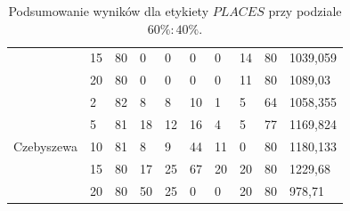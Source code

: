 \documentclass{classrep}
\begin{document}
\begin{table}[!ht]
\begin{tabular}{|l||l|l|l|l|l|l|l|l|l|}
                                      & 15                 & 80  & 0      & 0     & 0  & 0      & 14           & 80     & 1039,059                                     \\ \cline{2-10} 
                                      & 20                 & 80  & 0      & 0     & 0  & 0      & 11           & 80     & 1089,03                                      \\ \hline
    \multirow{5}{*}{Czebyszewa}       & 2                  & 82  & 8      & 8     & 10 & 1      & 5            & 64     & 1058,355                                     \\ \cline{2-10} 
                                      & 5                  & 81  & 18     & 12    & 16 & 4      & 5            & 77     & 1169,824                                     \\ \cline{2-10} 
                                      & 10                 & 81  & 8      & 9     & 44 & 11     & 0            & 80     & 1180,133                                     \\ \cline{2-10} 
                                      & 15                 & 80  & 17     & 25    & 67 & 20     & 20           & 80     & 1229,68                                      \\ \cline{2-10} 
                                      & 20                 & 80  & 50     & 25    & 0  & 0      & 20           & 80     & 978,71                                       \\ \hline
    \end{tabular}
    \caption{Podsumowanie wyników dla etykiety $PLACES$ przy podziale $60\%:40\%$.}
\end{table}
\end{document}
